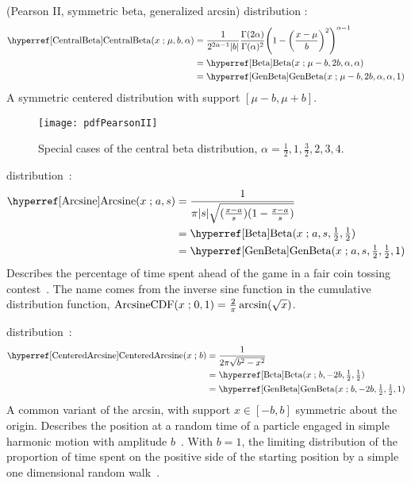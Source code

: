  (Pearson II, symmetric beta, generalized arcsin) distribution \cite{Pearson1895}: 
%
\begin{align}
\label{CentralBeta}
\opr{CentralBeta}(x\given \mu, b,\alpha) 
&= \frac{1}{2^{2\alpha-1}  |b|}\frac{\Gamma(2\alpha) }{ \Gamma(\alpha)^2 } \Left(1-\Left(\frac{x-\mu}{ b}\Right)^2 \Right)^{\alpha-1}
\checked
 \\
& = \opr{Beta}(x\given \mu-b, 2b,\alpha, \alpha) 
\notag  \checked \\
& = \opr{GenBeta}(x\given \mu-b, 2 b ,\alpha, \alpha,1) \notag
\checked
\end{align}
A symmetric centered distribution with support $[\mu-b, \mu+b]$.

\begin{figure}[tp!]
\begin{center}
\texttt{[image: pdfPearsonII]}
\end{center}
\caption[Central beta distributions]{Special cases of the central beta distribution, $\alpha=\tfrac{1}{2}, 1, \tfrac{3}{2}, 2, 3, 4$.}
\end{figure}


 distribution~\cite{Norton1975}:
\begin{align}
\label{Arcsine}
\opr{Arcsine}(x\given a, s) &= \frac{1}{\pi |s| \sqrt{(\tfrac{x-a}{s}) (1-\frac{x-a}{s} )}} \checked \\
& =\opr{Beta}(x\given a,s,   \tfrac{1}{2},  \tfrac{1}{2}) \notag \checked \\
& =\opr{GenBeta}(x\given a,s, \tfrac{1}{2}, \tfrac{1}{2},1) \notag \checked
\end{align}
Describes the percentage of time spent ahead of the game in a fair coin tossing contest~\cite{Johnson1995,Norton1975}. The name comes from the inverse sine function in the cumulative distribution function,
$
\operatorname{ArcsineCDF}(x\mathrel{;} 0,1) = \frac{2}{\pi} \operatorname{arcsin}( \sqrt{x}) 
$.



 
 distribution~\cite{Norton1975}: 
\begin{align}
\label{CenteredArcsine}
\opr{CenteredArcsine}(x\given b) &= \frac{1}{2 \pi  \sqrt{b^2-x^2}} \checked \\
& =\opr{Beta}(x\given b,-2b, \tfrac{1}{2}, \tfrac{1}{2})  \checked \notag \\
& =\opr{GenBeta}(x\given b,-2b, \tfrac{1}{2}, \tfrac{1}{2},1)  \checked \notag
\end{align}
A common variant of the arcsin, with support $x\in [-b,b]$ symmetric about the origin. Describes the position at a random time of a particle engaged in simple harmonic motion with amplitude $b$~\cite{Norton1975}. With $b=1$, the limiting distribution of the proportion of time spent on the positive side of the starting position by a simple one dimensional random walk~\cite{Feller1968}.


